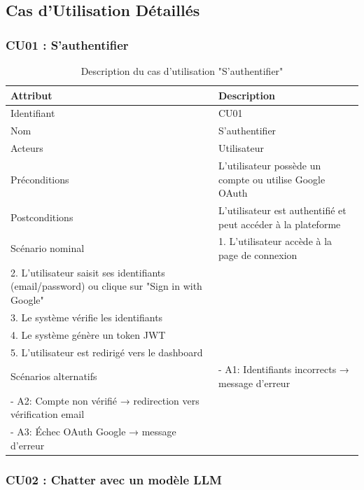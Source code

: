 \subsection{Cas d'Utilisation Détaillés}

\subsubsection{CU01 : S'authentifier}

\begin{table}[H]
\centering
\caption{Description du cas d'utilisation "S'authentifier"}
\label{tab:cu-auth}
\begin{tabular}{|l|p{10cm}|}
\hline
\textbf{Attribut} & \textbf{Description} \\
\hline
Identifiant & CU01 \\
\hline
Nom & S'authentifier \\
\hline
Acteurs & Utilisateur \\
\hline
Préconditions & L'utilisateur possède un compte ou utilise Google OAuth \\
\hline
Postconditions & L'utilisateur est authentifié et peut accéder à la plateforme \\
\hline
Scénario nominal & 
1. L'utilisateur accède à la page de connexion\\
2. L'utilisateur saisit ses identifiants (email/password) ou clique sur "Sign in with Google"\\
3. Le système vérifie les identifiants\\
4. Le système génère un token JWT\\
5. L'utilisateur est redirigé vers le dashboard \\
\hline
Scénarios alternatifs & 
- A1: Identifiants incorrects → message d'erreur\\
- A2: Compte non vérifié → redirection vers vérification email\\
- A3: Échec OAuth Google → message d'erreur \\
\hline
\end{tabular}
\end{table}

\subsubsection{CU02 : Chatter avec un modèle LLM}


